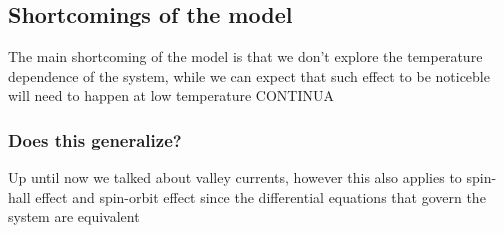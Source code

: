 \subsection{Shortcomings of the model}
The main shortcoming of the model is that we don't explore the temperature dependence of the system, while we can expect that such effect to be noticeble will need to happen at low temperature CONTINUA


\subsubsection*{Does this generalize?}
Up until now we talked about valley currents, however this also applies to spin-hall effect and spin-orbit effect since the differential equations that govern the system are equivalent

